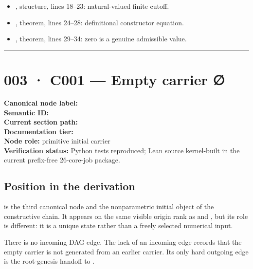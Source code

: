 \begin{itemize}
\tightlist
\item
  \texttt{\protect{}}, structure, lines 18--23:
  natural-valued finite cutoff.
\item
  \texttt{\protect{}}, theorem, lines 24--28: definitional constructor
  equation.
\item
  \texttt{\protect{}}, theorem, lines 29--34: zero is a genuine
  admissible value.
\end{itemize}

\begin{center}\rule{0.5\linewidth}{0.5pt}\end{center}

\section{003 · C001 --- Empty carrier ∅}\label{c001-empty-carrier}

\textbf{Canonical node label:} \texttt{\protect{}}\\
\textbf{Semantic ID:} \texttt{\protect{}}\\
\textbf{Current section path:} \texttt{\protect{}}\\
\textbf{Documentation tier:} \texttt{\protect{}}\\
\textbf{Node role:} primitive initial carrier\\
\textbf{Verification status:} Python tests reproduced; Lean source
kernel-built in the current prefix-free 26-core-job package.

\subsection{Position in the
derivation}\label{position-in-the-derivation-2}

\texttt{\protect{}} is the third canonical node and the nonparametric initial
object of the constructive chain. It appears on the same visible origin
rank as \texttt{\protect{}} and \texttt{\protect{}}, but its role is different: it
is a unique state rather than a freely selected numerical input.

There is no incoming DAG edge. The lack of an incoming edge records that
the empty carrier is not generated from an earlier carrier. Its only
hard outgoing edge is the root-genesis handoff to \texttt{\protect{}}.

